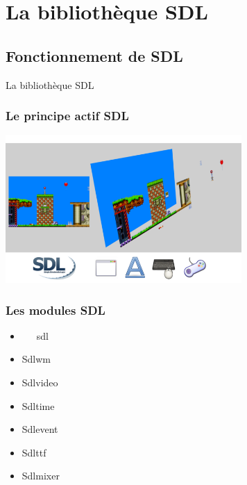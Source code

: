 \section[SDL]{La bibliothèque SDL}

\subsection{Fonctionnement de SDL} %
\begin{frame}
	\begin{center}
		\huge
		La bibliothèque SDL
	\end{center}
\end{frame}

\begin{frame}
	\frametitle{Le principe actif SDL}
	\begin{center}
		\includegraphics[width=9cm]{pics/sdlSurfaces.png}
	\end{center}
\end{frame}

\begin{frame}[fragile]
	\frametitle{Les modules SDL}
	\begin{center}
		\begin{minipage}{0.4\textwidth}
			\begin{itemize}
				\item ~~~sdl
			\end{itemize}
		\end{minipage}
	\end{center}
	\begin{center}
		\begin{minipage}{0.4\textwidth}
			\begin{itemize}
				\item Sdlwm
				\item Sdlvideo
				\item Sdltime
			\end{itemize}
		\end{minipage}
		\begin{minipage}{0.4\textwidth}
			\begin{itemize}
				\item Sdlevent
				\item Sdlttf
				\item Sdlmixer
			\end{itemize}
		\end{minipage}
	\end{center}
\end{frame}

